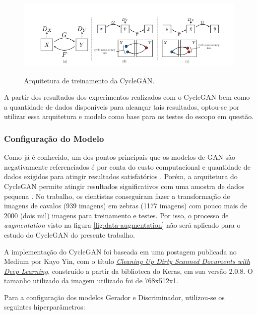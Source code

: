 \begin{figure}[H]
  \centering
  \caption{Arquitetura de treinamento da CycleGAN.}
  \includegraphics[scale=.57]{figuras/cycleconsistencyandlosses.png}
  \label{fig:cycleconsistencyandlosses}
\end{figure}

A partir dos resultados dos experimentos realizados com o CycleGAN bem como a quantidade de dados disponíveis para alcançar tais resultados, optou-se por utilizar essa arquitetura e modelo como base para os testes do escopo em questão.

\subsubsection{Configuração do Modelo}

Como já é conhecido, um dos pontos principais que os modelos de GAN são negativamente referenciados é por conta do custo computacional e quantidade de dados exigidos para atingir resultados satisfatórios \cite{f8-decrappification}. Porém, a arquitetura do CycleGAN permite atingir resultados significativos com uma amostra de dados pequena \cite{cycle-gan}. No trabalho, os cientistas conseguiram fazer a transformação de imagens de cavalos (939 imagens) em zebras (1177 imagens) com pouco mais de 2000 (dois mil) imagens para treinamento e testes. Por isso, o processo de \textit{augmentation} visto na figura \ref{fig:data-augmentation} não será aplicado para o estudo do CycleGAN do presente trabalho.

A implementação do CycleGAN foi baseada em uma postagem publicada no Medium por Kayo Yin, com o título \href{https://medium.com/illuin/cleaning-up-dirty-scanned-documents-with-deep-learning-2e8e6de6cfa6}{\textit{Cleaning Up Dirty Scanned Documents with Deep Learning}}, construído a partir da biblioteca do Keras, em sua versão 2.0.8. O tamanho utilizado da imagem utilizado foi de 768x512x1.

Para a configuração dos modelos Gerador e Discriminador, utilizou-se os seguintes hiperparâmetros:

